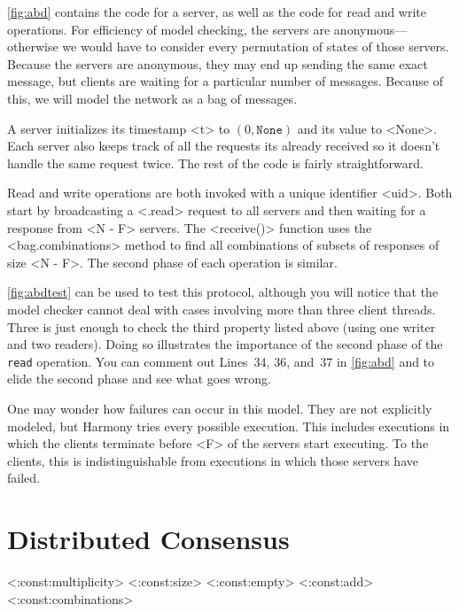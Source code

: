 \documentclass{report}
\begin{document}
\autoref{fig:abd} contains the code for a server, as well as the code
for read and write operations.
For efficiency of model checking, the servers are anonymous---otherwise
we would have to consider every permutation of states of those servers.
Because the servers are anonymous, they may end up sending the same
exact message, but clients are waiting for a particular number of
messages.
Because of this, we will model the network as a bag of messages.

A server initializes its timestamp <{t}> to
$(0, \mathtt{None})$ and its value to <{None}>.
Each server also keeps track of all the requests its already received
so it doesn't handle the same request twice.
The rest of the code is fairly straightforward.

Read and write operations are both invoked with a unique identifier
<{uid}>.  Both start by broadcasting a <{.read}>
request to all servers and then waiting for a response from
<{N - F}> servers.
The <{receive()}> function uses the <{bag.combinations}> method
to find all combinations of subsets of responses of size <{N - F}>.
The second phase of each operation is similar.

\autoref{fig:abdtest} can be used to test this protocol, although
you will notice that the model checker cannot deal with cases involving
more than three client threads.
Three is just enough to check the third property listed above
(using one writer and two readers).
Doing so illustrates the importance of the second phase of the \texttt{read}
operation.  You can comment out Lines~34, 36, and~37 in \autoref{fig:abd}
and to elide the second phase and see what goes wrong.

One may wonder how failures can occur in this model.  They are not
explicitly modeled, but Harmony tries every possible execution.
This includes executions in which the clients terminate before
<{F}> of the servers start executing.  To the clients, this
is indistinguishable from executions in which those
servers have failed.

\chapter{Distributed Consensus}
\label{ch:consensus}

<{:const:multiplicity}>
<{:const:size}>
<{:const:empty}>
<{:const:add}>
<{:const:combinations}>
\end{document}
